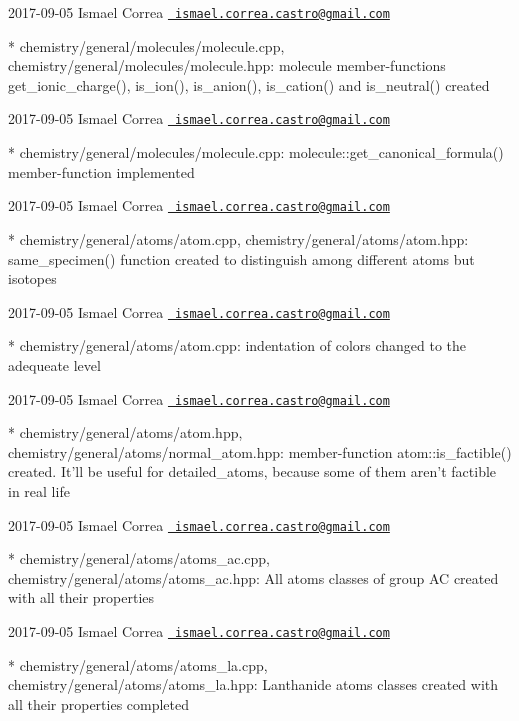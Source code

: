  2017-\/09-\/05 Ismael Correa \href{mailto:ismael.correa.castro@gmail.com}{\texttt{ ismael.\+correa.\+castro@gmail.\+com}} \begin{DoxyVerb}* chemistry/general/molecules/molecule.cpp,
chemistry/general/molecules/molecule.hpp: molecule member-functions
get_ionic_charge(), is_ion(), is_anion(), is_cation() and
is_neutral() created
\end{DoxyVerb}
 2017-\/09-\/05 Ismael Correa \href{mailto:ismael.correa.castro@gmail.com}{\texttt{ ismael.\+correa.\+castro@gmail.\+com}} \begin{DoxyVerb}* chemistry/general/molecules/molecule.cpp: 
molecule::get_canonical_formula() member-function implemented
\end{DoxyVerb}
 2017-\/09-\/05 Ismael Correa \href{mailto:ismael.correa.castro@gmail.com}{\texttt{ ismael.\+correa.\+castro@gmail.\+com}} \begin{DoxyVerb}* chemistry/general/atoms/atom.cpp,
chemistry/general/atoms/atom.hpp: same_specimen() function created
to distinguish among different atoms but isotopes
\end{DoxyVerb}
 2017-\/09-\/05 Ismael Correa \href{mailto:ismael.correa.castro@gmail.com}{\texttt{ ismael.\+correa.\+castro@gmail.\+com}} \begin{DoxyVerb}* chemistry/general/atoms/atom.cpp: indentation of colors changed to
the adequeate level
\end{DoxyVerb}
 2017-\/09-\/05 Ismael Correa \href{mailto:ismael.correa.castro@gmail.com}{\texttt{ ismael.\+correa.\+castro@gmail.\+com}} \begin{DoxyVerb}* chemistry/general/atoms/atom.hpp,
chemistry/general/atoms/normal_atom.hpp: member-function
atom::is_factible() created. It'll be useful for detailed_atoms,
because some of them aren't factible in real life
\end{DoxyVerb}
 2017-\/09-\/05 Ismael Correa \href{mailto:ismael.correa.castro@gmail.com}{\texttt{ ismael.\+correa.\+castro@gmail.\+com}} \begin{DoxyVerb}* chemistry/general/atoms/atoms_ac.cpp,
chemistry/general/atoms/atoms_ac.hpp: All atoms classes of group AC
created with all their properties
\end{DoxyVerb}
 2017-\/09-\/05 Ismael Correa \href{mailto:ismael.correa.castro@gmail.com}{\texttt{ ismael.\+correa.\+castro@gmail.\+com}} \begin{DoxyVerb}* chemistry/general/atoms/atoms_la.cpp,
chemistry/general/atoms/atoms_la.hpp: Lanthanide atoms classes
created with all their properties completed
\end{DoxyVerb}

